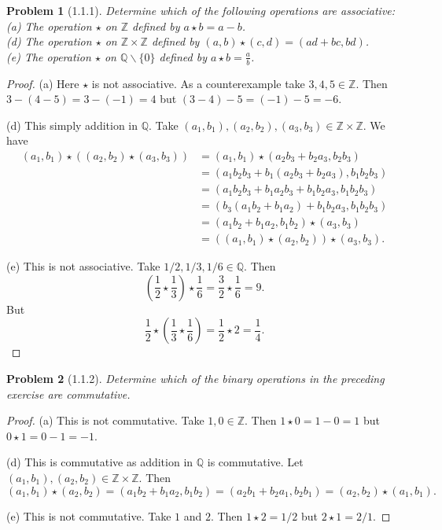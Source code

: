 \documentclass{article}
\newtheorem{problem}{Problem}
\begin{document}
\begin{problem}[1.1.1]
Determine which of the following operations are associative:\\
(a) The operation $\star$ on $\mathbb{Z}$ defined by $a \star b = a - b$.\\
(d) The operation $\star$ on $\mathbb{Z} \times \mathbb{Z}$ defined by $(a,b) \star (c,d) = (ad + bc, bd)$.\\
(e) The operation $\star$ on $\mathbb{Q} \backslash \{0\}$ defined by $a \star b = \frac{a}{b}$.
\end{problem}
\begin{proof}
(a) Here $\star$ is not associative. As a counterexample take $3, 4, 5 \in \mathbb{Z}$. Then $3 - (4 - 5) = 3 - (-1) = 4$ but $(3-4) - 5 = (-1) - 5 = -6$.

(d) This simply addition in $\mathbb{Q}$. Take $(a_1, b_1), (a_2,b_2), (a_3,b_3) \in \mathbb{Z} \times \mathbb{Z}$. We have
\begin{align*}
(a_1,b_1) \star ((a_2,b_2) \star (a_3,b_3))
&= (a_1,b_1) \star (a_2b_3 + b_2a_3,b_2b_3) \\
&= (a_1b_2b_3 + b_1(a_2b_3 + b_2a_3), b_1b_2b_3) \\
&= (a_1b_2b_3 + b_1a_2b_3 + b_1b_2a_3, b_1b_2b_3) \\
&= (b_3(a_1b_2 + b_1a_2) + b_1b_2a_3, b_1b_2b_3) \\
&= (a_1b_2 + b_1a_2, b_1b_2) \star (a_3,b_3) \\
&= ((a_1,b_1) \star (a_2,b_2)) \star (a_3,b_3).
\end{align*}

(e) This is not associative. Take $1/2, 1/3, 1/6 \in \mathbb{Q}$. Then
\[
\left ( \frac{1}{2} \star \frac{1}{3} \right ) \star \frac{1}{6} = \frac{3}{2} \star \frac{1}{6} = 9.
\]
But
\[
\frac{1}{2} \star \left ( \frac{1}{3} \star \frac{1}{6} \right ) = \frac{1}{2} \star 2 = \frac{1}{4}.
\]
\end{proof}

\begin{problem}[1.1.2]
Determine which of the binary operations in the preceding exercise are commutative.
\end{problem}
\begin{proof}
(a) This is not commutative. Take $1, 0 \in \mathbb{Z}$. Then $1 \star 0 = 1 - 0 = 1$ but $0 \star 1 = 0 - 1 = -1$.

(d) This is commutative as addition in $\mathbb{Q}$ is commutative. Let $(a_1, b_1), (a_2, b_2) \in \mathbb{Z} \times \mathbb{Z}$. Then
\[
(a_1, b_1) \star (a_2, b_2) = (a_1b_2 + b_1a_2, b_1b_2) = (a_2b_1 + b_2a_1, b_2b_1) = (a_2, b_2) \star (a_1, b_1).
\]

(e) This is not commutative. Take $1$ and $2$. Then $1 \star 2 = 1/2$ but $2 \star 1 = 2/1$.
\end{proof}
\end{document}
